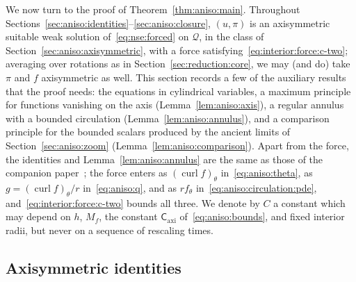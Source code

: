 \documentclass[11pt,reqno]{amsproc}
\numberwithin{equation}{section}
\theoremstyle{remark}
\newcommand{\curl}{\operatorname{curl}}
\newcommand{\Caxi}{\mathsf{C}_{\mathrm{axi}}}
\begin{document}
We now turn to the proof of Theorem~\ref{thm:aniso:main}. Throughout Sections~\ref{sec:aniso:identities}--\ref{sec:aniso:closure}, $(u,\pi)$ is an axisymmetric suitable weak solution of~\eqref{eq:nse:forced} on $\mathcal Q$, in the class of Section~\ref{sec:aniso:axisymmetric}, with a force satisfying~\eqref{eq:interior:force:c-two}; averaging over rotations as in Section~\ref{sec:reduction:core}, we may (and do) take $\pi$ and $f$ axisymmetric as well. This section records a few of the auxiliary results that the proof needs: the equations in cylindrical variables, a maximum principle for functions vanishing on the axis (Lemma~\ref{lem:aniso:axis}), a regular annulus with a bounded circulation (Lemma~\ref{lem:aniso:annulus}), and a comparison principle for the bounded scalars produced by the ancient limits of Section~\ref{sec:aniso:zoom} (Lemma~\ref{lem:aniso:comparison}). Apart from the force, the identities and Lemma~\ref{lem:aniso:annulus} are the same as those of the companion paper~\cite{CIVEulerLength}; the force enters as $(\curl f)_\theta$ in~\eqref{eq:aniso:theta}, as $g=(\curl f)_\theta/r$ in~\eqref{eq:aniso:q}, and as $rf_\theta$ in~\eqref{eq:aniso:circulation:pde}, and~\eqref{eq:interior:force:c-two} bounds all three. We denote by $C$ a constant which may depend on $h$, $M_f$, the constant $\Caxi$ of~\eqref{eq:aniso:bounds}, and fixed interior radii, but never on a sequence of rescaling times.


\subsection{Axisymmetric identities}
\label{sec:aniso:equations}
\end{document}
